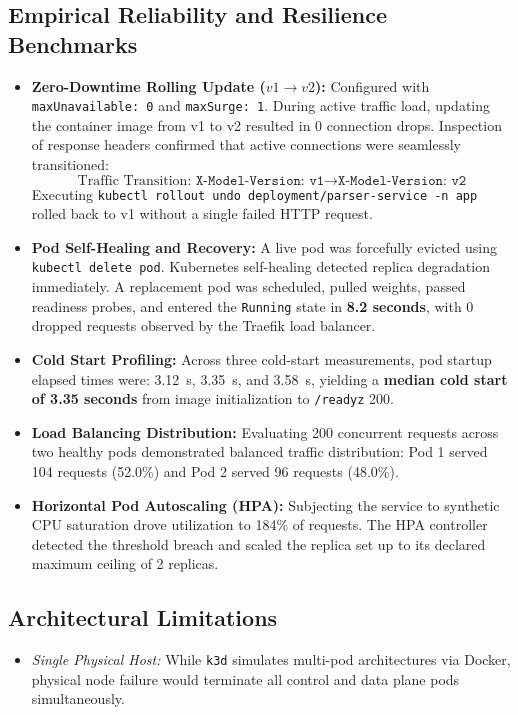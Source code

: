 \documentclass[10pt,a4paper]{article}
\begin{document}
\subsection{Empirical Reliability and Resilience Benchmarks}
\begin{itemize}[noitemsep,topsep=2pt,leftmargin=*]
    \item \textbf{Zero-Downtime Rolling Update ($v1 \to v2$):}
    Configured with \texttt{maxUnavailable: 0} and \texttt{maxSurge: 1}. During active traffic load, updating the container image from v1 to v2 resulted in 0 connection drops. Inspection of response headers confirmed that active connections were seamlessly transitioned:
    $$\text{Traffic Transition: } \texttt{X-Model-Version: v1} \longrightarrow \texttt{X-Model-Version: v2}$$
    Executing \texttt{kubectl rollout undo deployment/parser-service -n app} rolled back to v1 without a single failed HTTP request.
    
    \item \textbf{Pod Self-Healing and Recovery:}
    A live pod was forcefully evicted using \texttt{kubectl delete pod}. Kubernetes self-healing detected replica degradation immediately. A replacement pod was scheduled, pulled weights, passed readiness probes, and entered the \texttt{Running} state in \textbf{8.2 seconds}, with 0 dropped requests observed by the Traefik load balancer.
    
    \item \textbf{Cold Start Profiling:}
    Across three cold-start measurements, pod startup elapsed times were: 3.12~s, 3.35~s, and 3.58~s, yielding a \textbf{median cold start of 3.35 seconds} from image initialization to \texttt{/readyz} 200.
    
    \item \textbf{Load Balancing Distribution:}
    Evaluating 200 concurrent requests across two healthy pods demonstrated balanced traffic distribution: Pod 1 served 104 requests (52.0\%) and Pod 2 served 96 requests (48.0\%).
    
    \item \textbf{Horizontal Pod Autoscaling (HPA):}
    Subjecting the service to synthetic CPU saturation drove utilization to 184\% of requests. The HPA controller detected the threshold breach and scaled the replica set up to its declared maximum ceiling of 2 replicas.
\end{itemize}

\subsection{Architectural Limitations}
\begin{itemize}[noitemsep,topsep=2pt,leftmargin=*]
    \item \textit{Single Physical Host:} While \texttt{k3d} simulates multi-pod architectures via Docker, physical node failure would terminate all control and data plane pods simultaneously.
\end{itemize}
\end{document}
